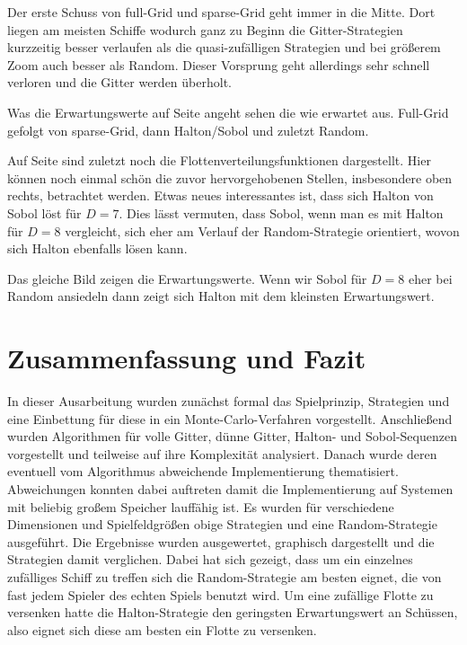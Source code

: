 \documentclass[a4paper,12pt]{llncs}
\numberwithin{equation}{section}
\begin{document}
Der erste Schuss von full-Grid und sparse-Grid geht immer in die Mitte. Dort liegen am meisten Schiffe wodurch ganz zu Beginn die Gitter-Strategien kurzzeitig besser verlaufen als die quasi-zufälligen Strategien und bei größerem Zoom auch besser als Random. Dieser Vorsprung geht allerdings sehr schnell  verloren und die Gitter werden überholt.

Was die Erwartungswerte auf Seite \pageref{fig:compare2} angeht sehen die wie erwartet aus. Full-Grid gefolgt von sparse-Grid, dann Halton/Sobol und zuletzt Random. 

Auf Seite \pageref{fig:compare3} sind zuletzt noch die Flottenverteilungsfunktionen dargestellt. Hier können noch einmal schön die zuvor hervorgehobenen Stellen, insbesondere oben rechts, betrachtet werden. Etwas neues interessantes ist, dass sich Halton von Sobol löst für $D=7$. Dies lässt vermuten, dass Sobol, wenn man es mit Halton für $D=8$ vergleicht, sich eher am Verlauf der Random-Strategie orientiert, wovon sich Halton ebenfalls lösen kann.

Das gleiche Bild zeigen die Erwartungswerte. Wenn wir Sobol für $D=8$ eher bei Random ansiedeln dann zeigt sich Halton mit dem kleinsten Erwartungswert.

\section{Zusammenfassung und Fazit}
In dieser Ausarbeitung wurden zunächst formal das Spielprinzip, Strategien und eine Einbettung für diese in ein Monte-Carlo-Verfahren vorgestellt. Anschließend wurden Algorithmen für volle Gitter, dünne Gitter, Halton- und Sobol-Sequenzen vorgestellt und teilweise auf ihre Komplexität analysiert. Danach wurde deren eventuell vom Algorithmus abweichende Implementierung thematisiert. Abweichungen konnten dabei auftreten damit die Implementierung  auf Systemen mit beliebig großem Speicher lauffähig ist. Es wurden für verschiedene Dimensionen und Spielfeldgrößen obige Strategien und eine Random-Strategie ausgeführt. Die Ergebnisse wurden ausgewertet, graphisch dargestellt und die Strategien damit verglichen. Dabei hat sich gezeigt, dass um ein einzelnes zufälliges Schiff zu treffen sich die Random-Strategie am besten eignet, die von fast jedem Spieler des echten Spiels benutzt wird. Um eine zufällige Flotte zu versenken hatte die Halton-Strategie den geringsten Erwartungswert an Schüssen, also eignet sich diese am besten ein Flotte zu versenken.


\newpage

% 
\end{document}
